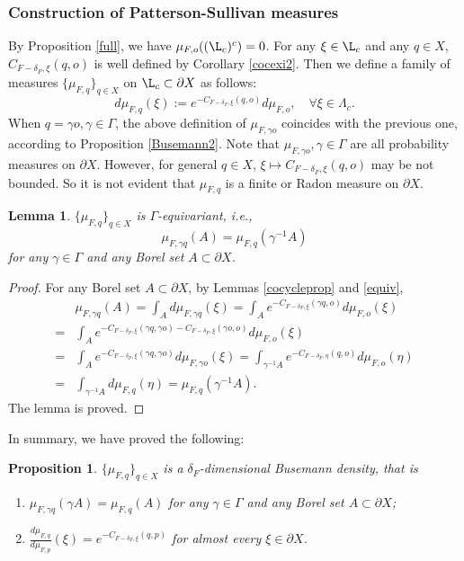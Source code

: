\documentclass[11pt]{amsart}
\newtheorem{lemma}[theorem]{Lemma}
\newtheorem{proposition}[theorem]{Proposition}
\theoremstyle{definition}
\def\pX{{\partial X}}
\def\c{\gamma}   \def\C{\Gamma}
\def\d{\delta}   %
\begin{document}
\subsubsection{Construction of Patterson-Sullivan measures}
By Proposition \ref{full}, we have $\mu_{F,o}((\L_c)^c)=0$. For any $\xi\in \L_c$ and any $q\in X$, $C_{F-\d_F,\xi}(q,o)$ is well defined by Corollary \ref{cocexi2}. Then we define a family of measures $\{\mu_{F,q}\}_{q\in X}$ on $\L_c\subset \pX$ as follows:
\[d\mu_{F,q}(\xi):=e^{-C_{F-\d_F,\xi}(q,o)}d\mu_{F,o}, \quad \forall \xi\in \Lambda_c.\]
When $q=\c o, \c\in \C$, the above definition of $\mu_{F, \c o}$ coincides with the previous one, according to Proposition \ref{Busemann2}. Note that $\mu_{F, \c o}, \c\in \C$ are all probability measures on $\pX$. However, for general $q\in X$, $\xi\mapsto C_{F-\d_F,\xi}(q,o)$ may be not bounded. So it is not evident that $\mu_{F,q}$ is a finite or Radon measure on $\pX$.
\begin{lemma}\label{gamma}
$\{\mu_{F,q}\}_{q\in X}$ is $\Gamma$-equivariant, i.e.,
 $$\mu_{F,\gamma q}(A)=\mu_{F,q}(\c^{-1}A)$$
  for any $\c\in \Gamma$ and any Borel set $A\subset \pX$.
\end{lemma}
\begin{proof}
For any Borel set $A\subset \pX$, by Lemmas \ref{cocycleprop} and \ref{equiv},
\begin{equation*}
\begin{aligned}
&\mu_{F, \c q}(A)=\int_Ad\mu_{F, \c q}(\xi)=\int_A e^{-C_{F-\d_F,\xi}(\c q, o)}d\mu_{F,o}(\xi)\\
=&\int_A e^{-C_{F-\d_F,\xi}(\c q,\c o)-C_{F-\d_F,\xi}(\c o, o)}d\mu_{F,o}(\xi)\\
=&\int_Ae^{-C_{F-\d_F,\xi}(\c q,\c o)}d\mu_{F,\c o}(\xi)=\int_{\c^{-1}A} e^{-C_{F-\d_F,\eta}(q,o)}d\mu_{F, o}(\eta)\\
=&\int_{\c^{-1}A} d\mu_{F, q}(\eta)=\mu_{F, q}(\c^{-1}A).
\end{aligned}
\end{equation*}
The lemma is proved.
\end{proof}

In summary, we have proved the following:
\begin{proposition}\label{ps_a}
$\{\mu_{F,q}\}_{q\in X}$ is a $\d_F$-dimensional Busemann density, that is
\begin{enumerate}
  \item $\mu_{F,\gamma q}(\gamma A)=\mu_{F,q}(A)$ for any $\c\in \Gamma$ and any Borel set $A\subset \pX$;
  \item $\frac{d\mu_{F,q}}{d\mu_{F,p}}(\xi)=e^{-C_{F-\d_F,\xi}(q,p)}$ for almost every $\xi\in \pX$.
\end{enumerate}
\end{proposition}
\end{document}
